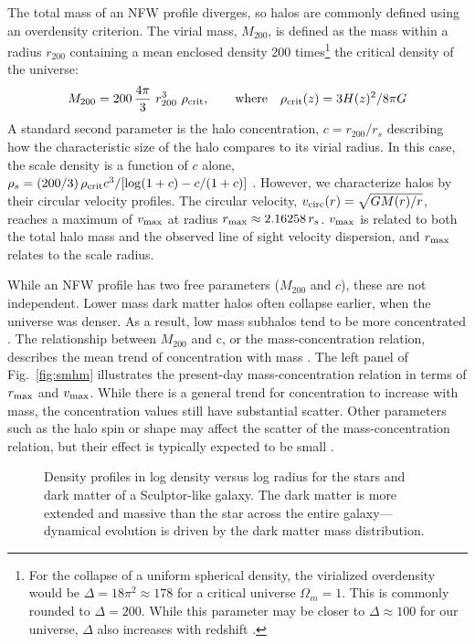 The total mass of an NFW profile diverges, so halos are commonly defined
using an overdensity criterion. The virial mass, \(M_{200}\), is defined
as the mass within a radius \(r_{200}\) containing a mean enclosed
density 200 times\footnote{For the collapse of a uniform spherical
  density, the virialized overdensity would be
  \(\Delta = 18\pi^2\approx 178\) for a critical universe
  \(\Omega_m = 1\). This is commonly rounded to \(\Delta = 200\). While
  this parameter may be closer to \(\Delta \approx 100\) for our
  universe, \(\Delta\) also increases with redshift \citep[using eq. 6
  from][]{bryan+norman1998}.} the critical density of the universe:
\begin{equation}{
M_{200} =200\,\frac{4\pi}{3} \ r_{200}^3\ \rho_{\rm crit}, \qquad {\rm where} \quad \rho_{\rm crit}(z) = 3H(z)^2 / 8\pi G
}\end{equation} A standard second parameter is the halo concentration,
\(c=r_{200} / r_s\) describing how the characteristic size of the halo
compares to its virial radius. In this case, the scale density is a
function of \(c\) alone,
\(\rho_s = (200/3)\,\rho_{\rm crit} c^3 / [\log(1+c) - c/(1+c)]\)
\citep{NFW1996}. However, we characterize halos by their circular
velocity profiles. The circular velocity,
\(v_{\rm circ}(r) = \sqrt{G M(r) / r}\), reaches a maximum of
\(v_{\rm max}\) at radius \(r_{\rm max} \approx 2.16258\,r_s\).
\(v_{\rm max}\) is related to both the total halo mass and the observed
line of sight velocity dispersion, and \(r_{\rm max}\) relates to the
scale radius.

While an NFW profile has two free parameters (\(M_{200}\) and \(c\)),
these are not independent. Lower mass dark matter halos often collapse
earlier, when the universe was denser. As a result, low mass subhalos
tend to be more concentrated \citep[e.g.,][]{NFW1997}. The relationship
between \(M_{200}\) and c, or the mass-concentration relation, describes
the mean trend of concentration with mass
\citep[e.g.,][]{bullock+2001, ludlow+2016}. The left panel of
Fig.~\ref{fig:smhm} illustrates the present-day mass-concentration
relation in terms of \(r_{\rm max}\) and \(v_{\rm max}\). While there is
a general trend for concentration to increase with mass, the
concentration values still have substantial scatter. Other parameters
such as the halo spin or shape may affect the scatter of the
mass-concentration relation, but their effect is typically expected to
be small \citep{navarro+2010, dicintio+2013, dutton+maccio2014}.

\begin{figure}
\centering
{}
\caption[Example density profiles]{Density profiles in log density
versus log radius for the stars and dark matter of a Sculptor-like
galaxy. The dark matter is more extended and massive than the star
across the entire galaxy---dynamical evolution is driven by the dark
matter mass distribution.}\label{fig:nfw_density}
\end{figure}

